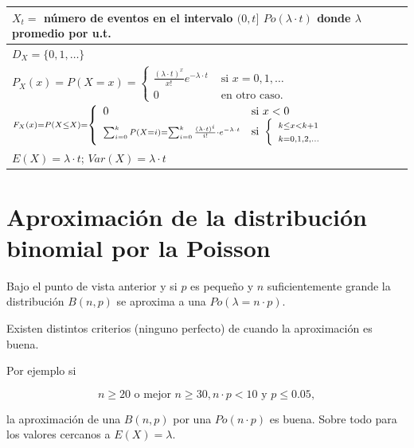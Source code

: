 \documentclass[
  letterpaper,
  DIV=11,
  numbers=noendperiod]{scrreprt}
\begin{document}
\renewcommand{\arraystretch}{1.75}
\begin{table}
\centering
\begin{tabular}{|l|}
\hline\rowcolor{LightBlue}
$X_t=$ número de eventos en el intervalo $(0,t]$  $Po(\lambda\cdot t)$  donde  $\lambda$ promedio por u.t. 
\\\hline
$D_X=\{0,1,\ldots \}$ \\\hline
$P_X(x)=P(X=x)=\left\{\begin{array}{ll}  \frac{(\lambda\cdot t)^x}{x!}e^{-\lambda\cdot t} & \mbox{ si } x=0,1,\ldots\\ 0  & \mbox{ en otro caso.}\end{array}\right.$\\\hline
$\scriptstyle F_X(x)=P(X\leq X)=\left\{\begin{array}{ll} 0 & \mbox{si } x<0\\\displaystyle\scriptstyle\sum_{i=0}^{k} P(X=i)= \displaystyle\scriptstyle\sum_{i=0}^{k} \frac{(\lambda\cdot t)^i}{i!}\cdot e^{-\lambda\cdot t} & \mbox{si  }\left\{\begin{array}{l}\scriptstyle k\leq x< k+1\\\scriptstyle k=0,1,2,\ldots\end{array}\right.\end{array}\right.$

   \\\hline
$E(X)=\lambda\cdot t$; $Var(X)=\lambda\cdot t$\\\hline
\end{tabular}
\end{table}

\section{Aproximación de la distribución binomial por la
Poisson}\label{aproximaciuxf3n-de-la-distribuciuxf3n-binomial-por-la-poisson}

Bajo el punto de vista anterior y si \(p\) es pequeño y \(n\)
suficientemente grande la distribución \(B(n,p)\) se aproxima a una
\(Po(\lambda=n\cdot p)\).

Existen distintos criterios (ninguno perfecto) de cuando la aproximación
es buena.

Por ejemplo si

\[n\geq 20\mbox{ o mejor }n\geq 30, n\cdot p < 10 \mbox{ y } p\leq 0.05,\]

la aproximación de una \(B(n,p)\) por una \(Po(n\cdot p)\) es buena.
Sobre todo para los valores cercanos a \(E(X)=\lambda\).
\end{document}
